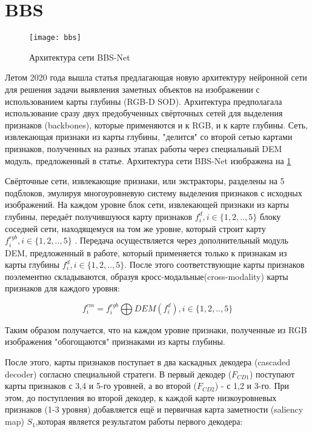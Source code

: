 \section{BBS}

\begin{figure}[h]
    \centering
    \texttt{[image: bbs]}
    \caption{Архитектура сети BBS-Net}
    \label{fig:bbs}
\end{figure}

Летом 2020 года вышла статья \cite{BBS} предлагающая новую архитектуру нейронной сети для решения задачи выявления заметных объектов на изображении 
с использованием карты глубины (RGB-D SOD). Архитектура предполагала использование сразу двух предобученных свёрточных сетей
для выделения признаков (backbones), которые применяются и к RGB, и к карте глубины. Сеть, извлекающая признаки
из карты глубины, "делится" со второй сетью картами признаков, полученных на разных этапах работы через специальный DEM модуль, 
предложенный в статье. Архитектура сети BBS-Net изображена на \ref{fig:bbs}


Свёрточные сети, извлекающие признаки, или экстракторы, разделены на 5 подблоков, эмулируя многоуровневую систему выделения признаков с исходных изображений.
На каждом уровне блок сети, извлекающей признаки из карты глубины, передаёт получившуюся карту признаков $f_i^d, i \in \{1,2,..,5\}$ блоку соседней сети, 
находящемуся на том же уровне, который строит карту $f_i^{rgb}, i \in \{1,2,..,5\}$ . Передача осуществляется через дополнительный модуль DEM, предложенный в работе,
который применяется только к признакам из карты глубины $f_i^d, i \in \{1,2,..,5\}$. 
После этого соответствующие карты признаков поэлементно складываются, образуя кросс-модальные(cross-modality) карты признаков для каждого уровня:

\begin{equation}
    f_i^{cm} = f_i^{rgb} \bigoplus DEM(f_i^{d}), i \in \{1,2,..,5\}
    \label{eq:DEM}
\end{equation}

Таким образом получается, что на каждом уровне признаки, полученные из RGB изображения "обогощаются" признаками из карты глубины.

После этого, карты признаков поступает в два каскадных декодера (cascaded decoder) согласно специальной стратеги. В первый декодер ($F_{CD1}$)
поступают карты признаков с 3,4 и 5-го уровней, а во второй  ($F_{CD2}$) - с 1,2 и 3-го. При этом, до поступления во второй декодер, к каждой карте низкоуровневых 
признаков (1-3 уровня) добавляется ещё и первичная карта заметности (saliency map) $S_1$,которая является результатом работы первого декодера:

